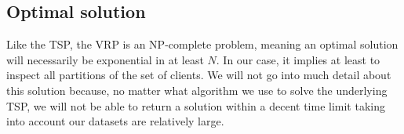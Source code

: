 \subsection{Optimal solution} \label{algorithm-vrp-optimal}
Like the \acrshort*{TSP}, the \acrshort*{VRP} is an NP-complete problem, meaning an optimal solution will necessarily be exponential in at least $N$. In our case, it implies at least to inspect all partitions of the set of clients. We will not go into much detail about this solution because, no matter what algorithm we use to solve the underlying \acrshort*{TSP}, we will not be able to return a solution within a decent time limit taking into account our datasets are relatively large.
